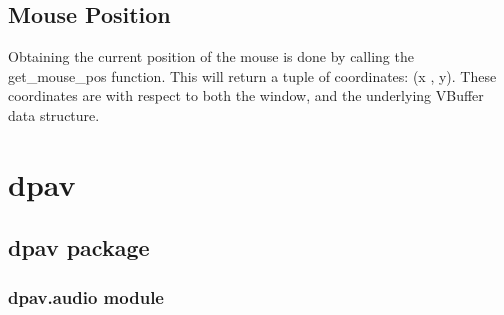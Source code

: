 \documentclass[letterpaper,10pt,english]{sphinxmanual}
\begin{document}
\section{Mouse Position}
\label{\detokenize{fundamentals:mouse-position}}
\sphinxAtStartPar
Obtaining the current position of the mouse is done by calling the get\_mouse\_pos function. This will return a tuple of coordinates: (x , y). These coordinates are with respect to both the window, and the underlying VBuffer data structure.
\def\sphinxLiteralBlockLabel{\label{\detokenize{fundamentals:id17}}}
\begin{sphinxVerbatim}[commandchars=\\\{\}]
    
       
        
     \PYG{p}{[}\PYG{p}{[}\PYG{p}{]} \PYG{p}{[}\PYG{p}{]}\PYG{p}{]}   
\end{sphinxVerbatim}


\chapter{dpav}
\label{\detokenize{modules:dpav}}\label{\detokenize{modules::doc}}

\section{dpav package}
\label{\detokenize{dpav:dpav-package}}\label{\detokenize{dpav::doc}}

\subsection{dpav.audio module}
\label{\detokenize{dpav:module-dpav.audio}}\label{\detokenize{dpav:dpav-audio-module}}
\end{document}
